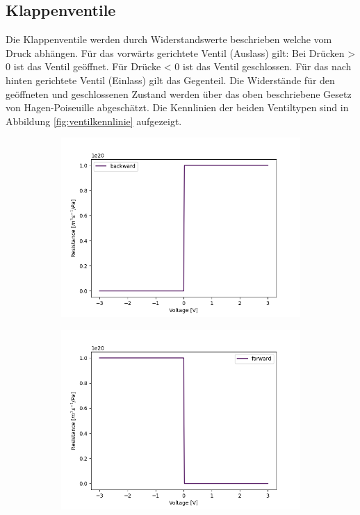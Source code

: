 \documentclass[fontsize=12pt, a4paper]{scrartcl}
\begin{document}
\subsection{Klappenventile}
\label{subsec:ventilsection}

Die Klappenventile werden durch Widerstandswerte beschrieben welche vom Druck abhängen. Für das vorwärts gerichtete Ventil (Auslass) gilt: Bei Drücken > 0 ist das Ventil geöffnet. Für Drücke < 0 ist das Ventil geschlossen. Für das nach hinten gerichtete Ventil (Einlass) gilt das Gegenteil. Die Widerstände für den geöffneten und geschlossenen Zustand werden über das oben beschriebene Gesetz von Hagen-Poiseuille abgeschätzt. Die Kennlinien der beiden Ventiltypen sind in Abbildung \ref{fig:ventilkennlinie} aufgezeigt.

\begin{figure}[H]
	\centering
	\begin{subfigure}[H]{0.48\textwidth}
		\includegraphics[width=\textwidth, valign=t]{bilder/Kennlinien/velve_backwards.png}
	\end{subfigure}
	\begin{subfigure}[H]{0.48\textwidth}
		\includegraphics[width=\textwidth, valign=t]{bilder/Kennlinien/velve_forwards.png}

\end{subfigure}
\end{figure}
\end{document}
